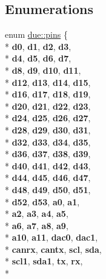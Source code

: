 \subsection*{Enumerations}
\begin{DoxyCompactItemize}
\item 
enum \hyperlink{namespacedue_a8ffa3ec309934ff9db34317e504bcc92}{due\+::pins} \{ \\*
{\bfseries d0}, 
{\bfseries d1}, 
{\bfseries d2}, 
{\bfseries d3}, 
\\*
{\bfseries d4}, 
{\bfseries d5}, 
{\bfseries d6}, 
{\bfseries d7}, 
\\*
{\bfseries d8}, 
{\bfseries d9}, 
{\bfseries d10}, 
{\bfseries d11}, 
\\*
{\bfseries d12}, 
{\bfseries d13}, 
{\bfseries d14}, 
{\bfseries d15}, 
\\*
{\bfseries d16}, 
{\bfseries d17}, 
{\bfseries d18}, 
{\bfseries d19}, 
\\*
{\bfseries d20}, 
{\bfseries d21}, 
{\bfseries d22}, 
{\bfseries d23}, 
\\*
{\bfseries d24}, 
{\bfseries d25}, 
{\bfseries d26}, 
{\bfseries d27}, 
\\*
{\bfseries d28}, 
{\bfseries d29}, 
{\bfseries d30}, 
{\bfseries d31}, 
\\*
{\bfseries d32}, 
{\bfseries d33}, 
{\bfseries d34}, 
{\bfseries d35}, 
\\*
{\bfseries d36}, 
{\bfseries d37}, 
{\bfseries d38}, 
{\bfseries d39}, 
\\*
{\bfseries d40}, 
{\bfseries d41}, 
{\bfseries d42}, 
{\bfseries d43}, 
\\*
{\bfseries d44}, 
{\bfseries d45}, 
{\bfseries d46}, 
{\bfseries d47}, 
\\*
{\bfseries d48}, 
{\bfseries d49}, 
{\bfseries d50}, 
{\bfseries d51}, 
\\*
{\bfseries d52}, 
{\bfseries d53}, 
{\bfseries a0}, 
{\bfseries a1}, 
\\*
{\bfseries a2}, 
{\bfseries a3}, 
{\bfseries a4}, 
{\bfseries a5}, 
\\*
{\bfseries a6}, 
{\bfseries a7}, 
{\bfseries a8}, 
{\bfseries a9}, 
\\*
{\bfseries a10}, 
{\bfseries a11}, 
{\bfseries dac0}, 
{\bfseries dac1}, 
\\*
{\bfseries canrx}, 
{\bfseries cantx}, 
{\bfseries scl}, 
{\bfseries sda}, 
\\*
{\bfseries scl1}, 
{\bfseries sda1}, 
{\bfseries tx}, 
{\bfseries rx}, 
\\*

\end{DoxyCompactItemize}
